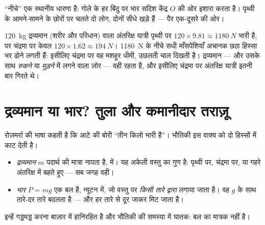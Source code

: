 \begin{omfigure}

{\small ``नीचे'' एक स्थानीय धारणा है: गोले के हर बिंदु पर भार
सदिश केंद्र $O$ की ओर इशारा करता है। पृथ्वी के आमने-सामने के छोरों पर
चलते दो लोग, दोनों सीधे खड़े हैं --- पैर एक-दूसरे की ओर।}
\end{omfigure}

\begin{remark}[अंतरिक्ष यात्री उछलते क्यों हैं]\label{rem:g10:universal-gravitation:bounce}
\qty{120}{kg} द्रव्यमान (शरीर और परिधान) वाला अंतरिक्ष यात्री पृथ्वी पर $120 \times 9.81 \approx \qty{1180}{N}$
भारी है, पर चंद्रमा पर केवल $120 \times 1.62 \approx \qty{194}{N}$। \qty{1180}{N} के नीचे सधी माँसपेशियाँ
अचानक छठा हिस्सा भर ढोने लगती हैं: इसीलिए चंद्रमा पर वह मशहूर धीमी,
उछलती चाल दिखती है। द्रव्यमान --- और उसके साथ \emph{रुकने} या
\emph{मुड़ने} में लगने वाला ज़ोर --- वही रहता है, और इसीलिए चंद्रमा पर
अंतरिक्ष यात्री इतनी बार गिरते थे।
\end{remark}

\section{द्रव्यमान या भार? तुला और कमानीदार तराज़ू}

रोज़मर्रा की भाषा कहती है कि आटे की बोरी ``तीन किलो भारी है''। भौतिकी इस
वाक्य को दो हिस्सों में काट देती है।

\begin{remark}[द्रव्यमान भार नहीं है]\label{rem:g10:universal-gravitation:massweight}
\begin{itemize}
  \item \emph{द्रव्यमान} $m$ पदार्थ की मात्रा नापता है,
         में। यह अकेली वस्तु का गुण है: पृथ्वी पर,
        चंद्रमा पर, या गहरे अंतरिक्ष में बहते हुए --- सब जगह वही।
  \item \emph{भार} $P = mg$ एक बल है, न्यूटन में, जो वस्तु पर
        \emph{किसी तारे द्वारा} लगाया जाता है। वह $g$ के साथ तारे-दर
        तारे बदलता है --- और हर तारे से दूर जाकर मिट जाता है।
\end{itemize}
इन्हें गड्डमड्ड करना बाज़ार में हानिरहित है और भौतिकी की समस्या में
घातक:  बल का मात्रक नहीं है।
\end{remark}

